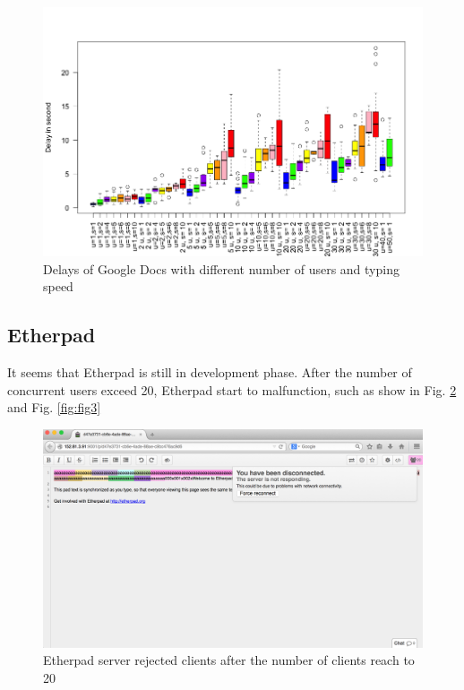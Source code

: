 \documentclass[a4paper,12pt]{report}
\begin{document}
	\begin{figure}
		\includegraphics[width=\textwidth]{Rplot02}	
		\caption{Delays of Google Docs with different number of users and typing speed}
		\label{fig:fig1}
	\end{figure}
	
\subsection{Etherpad}
It seems that Etherpad is still in development phase. After the number of concurrent users exceed 20, Etherpad start to malfunction, such as show in Fig. \ref{fig:fig2} and Fig. \ref{fig:fig3}

	\begin{figure}
		\includegraphics[width=\textwidth]{etherpad1}
		\caption{Etherpad server rejected clients after the number of clients reach to 20}
		\label{fig:fig2}
	\end{figure}
\end{document}
